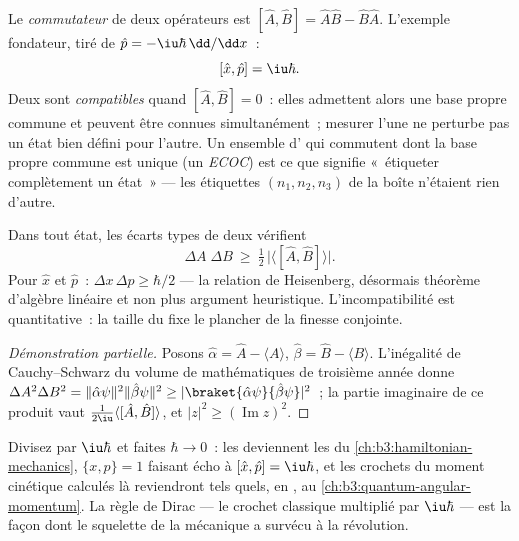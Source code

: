\begin{definition}\label{def:b3:quantum-formalism:commutator}
Le \emph{commutateur} de deux opérateurs est $[\hat A, \hat B] = \hat
A\hat B - \hat B\hat A$. L'exemple fondateur, tiré de $\hat p =
-\iu\hbar\,\dd/\dd x$~:
\[
[\hat x, \hat p] = \iu\hbar .
\]
Deux  sont \emph{compatibles} quand $[\hat A, \hat B] = 0$~:
elles admettent alors une base propre commune et peuvent être connues
simultanément~; mesurer l'une ne perturbe pas un état bien défini pour
l'autre. Un ensemble d' qui commutent dont la base propre
commune est unique (un \emph{ECOC}) est ce que signifie «~étiqueter
complètement un état~» --- les étiquettes $(n_1, n_2, n_3)$ de la
boîte n'étaient rien d'autre.
\end{definition}

\begin{theorem}\label{thm:b3:quantum-formalism:uncertainty}
Dans tout état, les écarts types de deux  vérifient
\[
\Delta A\;\Delta B \ \ge\ \tfrac12\,\big|\langle[\hat A, \hat
B]\rangle\big| .
\]
Pour $\hat x$ et $\hat p$~: $\Delta x\,\Delta p \ge \hbar/2$ --- la
relation de Heisenberg, désormais théorème d'algèbre linéaire et non
plus argument heuristique. L'incompatibilité est quantitative~: la
taille du  fixe le plancher de la finesse conjointe.
\end{theorem}

\begin{proof}[Démonstration partielle]
Posons $\hat\alpha = \hat A - \langle A\rangle$, $\hat\beta = \hat B -
\langle B\rangle$. L'inégalité de Cauchy--Schwarz du volume de
mathématiques de troisième année donne $\Delta A^2\Delta B^2 =
\|\hat\alpha\psi\|^2\|\hat\beta\psi\|^2 \ge
|\braket{\hat\alpha\psi}{\hat\beta\psi}|^2$~; la partie imaginaire de
ce produit vaut $\tfrac1{2\iu}\langle[\hat A, \hat B]\rangle$, et
$|z|^2 \ge (\operatorname{Im}z)^2$.
\end{proof}

\begin{remark}\label{rem:b3:quantum-formalism:poisson}
Divisez par $\iu\hbar$ et faites $\hbar \to 0$~: les 
deviennent les  du \cref{ch:b3:hamiltonian-mechanics}, $\{x, p\} =
1$ faisant écho à $[\hat x, \hat p] = \iu\hbar$, et les crochets du
moment cinétique calculés là reviendront tels quels, en ,
au \cref{ch:b3:quantum-angular-momentum}. La règle de Dirac --- le
crochet classique multiplié par $\iu\hbar$ --- est la façon dont le
squelette de la mécanique a survécu à la révolution.
\end{remark}

